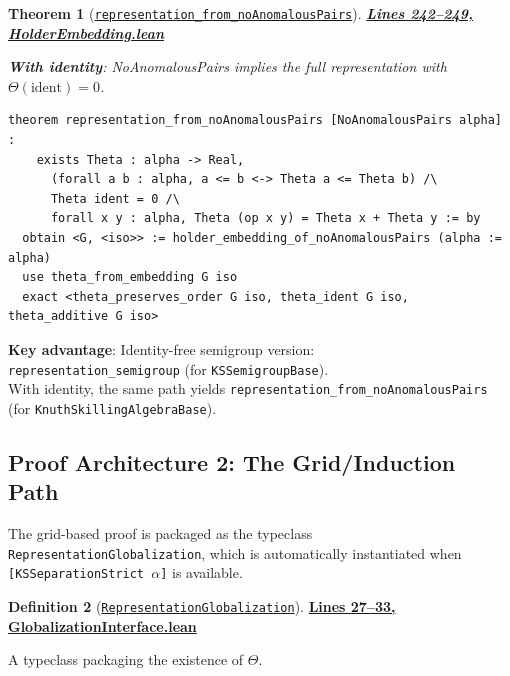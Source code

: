 \documentclass[11pt]{article}
\newtheorem{theorem}{Theorem}[section]
\theoremstyle{definition}
\newtheorem{definition}[theorem]{Definition}
\theoremstyle{remark}
\begin{document}
\begin{theorem}[\href{https://github.com/zariuq/ks-foundations-of-inference/blob/main/KnuthSkilling/Additive/Proofs/OrderedSemigroupEmbedding/HolderEmbedding.lean\#L242}{\texttt{representation\_from\_noAnomalousPairs}}]
\textbf{\href{https://github.com/zariuq/ks-foundations-of-inference/blob/main/KnuthSkilling/Additive/Proofs/OrderedSemigroupEmbedding/HolderEmbedding.lean\#L242-L249}{Lines 242--249, HolderEmbedding.lean}}

\textbf{With identity}: NoAnomalousPairs implies the full representation with $\Theta(\text{ident}) = 0$.
\end{theorem}

\begin{lstlisting}[caption={Representation with identity normalization}]
theorem representation_from_noAnomalousPairs [NoAnomalousPairs alpha] :
    exists Theta : alpha -> Real,
      (forall a b : alpha, a <= b <-> Theta a <= Theta b) /\
      Theta ident = 0 /\
      forall x y : alpha, Theta (op x y) = Theta x + Theta y := by
  obtain <G, <iso>> := holder_embedding_of_noAnomalousPairs (alpha := alpha)
  use theta_from_embedding G iso
  exact <theta_preserves_order G iso, theta_ident G iso, theta_additive G iso>
\end{lstlisting}

\textbf{Key advantage}: Identity-free semigroup version:\\
\texttt{representation\_semigroup} (for \texttt{KSSemigroupBase}).\\
With identity, the same path yields
\texttt{representation\_from\_}\linebreak\texttt{noAnomalousPairs} (for \texttt{KnuthSkillingAlgebraBase}).

\subsection{Proof Architecture 2: The Grid/Induction Path}

The grid-based proof is packaged as the typeclass \texttt{RepresentationGlobalization},
which is automatically instantiated when \texttt{[KSSeparationStrict $\alpha$]} is available.

\begin{definition}[\href{https://github.com/zariuq/ks-foundations-of-inference/blob/main/KnuthSkilling/Additive/Proofs/GridInduction/GlobalizationInterface.lean\#L27}{\texttt{RepresentationGlobalization}}]
\textbf{\href{https://github.com/zariuq/ks-foundations-of-inference/blob/main/KnuthSkilling/Additive/Proofs/GridInduction/GlobalizationInterface.lean\#L27-L33}{Lines 27--33, GlobalizationInterface.lean}}

A typeclass packaging the existence of $\Theta$.
\end{definition}
\end{document}
